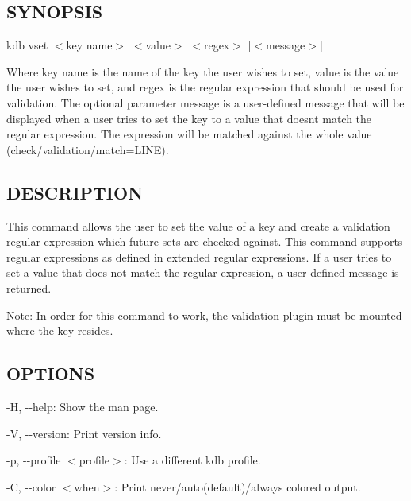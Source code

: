\subsection*{S\+Y\+N\+O\+P\+S\+IS}

{\ttfamily kdb vset $<$key name$>$ $<$value$>$ $<$regex$>$ \mbox{[}$<$message$>$\mbox{]}}

Where {\ttfamily key name} is the name of the key the user wishes to set, {\ttfamily value} is the value the user wishes to set, and {\ttfamily regex} is the regular expression that should be used for validation. The optional parameter {\ttfamily message} is a user-\/defined message that will be displayed when a user tries to set the key to a value that doesn\textquotesingle{}t match the regular expression. The expression will be matched against the whole value ({\ttfamily check/validation/match=L\+I\+NE}).

\subsection*{D\+E\+S\+C\+R\+I\+P\+T\+I\+ON}

This command allows the user to set the value of a key and create a validation regular expression which future sets are checked against. This command supports regular expressions as defined in extended regular expressions. If a user tries to set a value that does not match the regular expression, a user-\/defined message is returned.

Note\+: In order for this command to work, the {\ttfamily validation} plugin must be mounted where the key resides.

\subsection*{O\+P\+T\+I\+O\+NS}


\begin{DoxyItemize}
\item {\ttfamily -\/H}, {\ttfamily -\/-\/help}\+: Show the man page.
\item {\ttfamily -\/V}, {\ttfamily -\/-\/version}\+: Print version info.
\item {\ttfamily -\/p}, {\ttfamily -\/-\/profile $<$profile$>$}\+: Use a different kdb profile.
\item {\ttfamily -\/C}, {\ttfamily -\/-\/color $<$when$>$}\+: Print never/auto(default)/always colored output.
\end{DoxyItemize}

